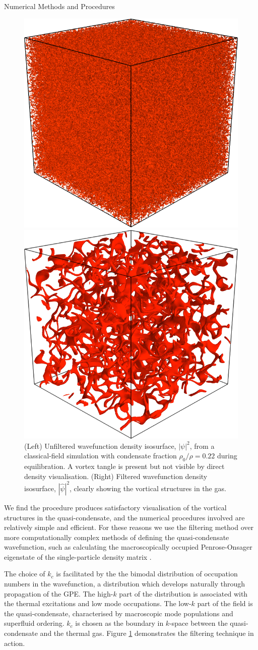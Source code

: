 \begin{chapter}{\label{cha:numerics}Numerical Methods and Procedures}
\begin{figure}
\centering
\includegraphics[width=0.35\linewidth]{numerics/figures/mess3d}%
    \begin{minipage}[b]{0.2\linewidth}
      \centering
      \raisebox{3cm}{$\longrightarrow$}
    \end{minipage}%
    \includegraphics[width=0.35\linewidth]{numerics/figures/clean3d}
  \caption{(Left) Unfiltered wavefunction density isosurface, $|\psi|^2$, from a classical-field simulation with condensate fraction $\rho_0/\rho=0.22$ during equilibration. A vortex tangle is present but not visible by direct density visualisation. (Right) Filtered wavefunction density isosurface, $|\hat{\psi}|^2$, clearly showing the vortical structures in the gas.}\label{fig:quasicondensatefilter}
  \end{figure}

We find the procedure produces satisfactory visualisation of the vortical structures in the quasi-condensate, and the numerical procedures involved are relatively simple and efficient. For these reasons we use the filtering method over more computationally complex methods of defining the quasi-condensate wavefunction, such as calculating the macroscopically occupied Penrose-Onsager eigenstate of the single-particle density matrix \cite{stringari}.

The choice of $k_c$ is facilitated by the the bimodal distribution of occupation numbers in the wavefunction, a distribution which develops naturally through propagation of the GPE. The high-$k$ part of the distribution is associated with the thermal excitations and low mode occupations. The low-$k$ part of the field is the quasi-condensate, characterised by macroscopic mode populations and superfluid ordering. $k_c$ is chosen as the boundary in $k$-space between the quasi-condensate and the thermal gas. Figure \ref{fig:quasicondensatefilter} demonstrates the filtering technique in action.


\end{chapter}
